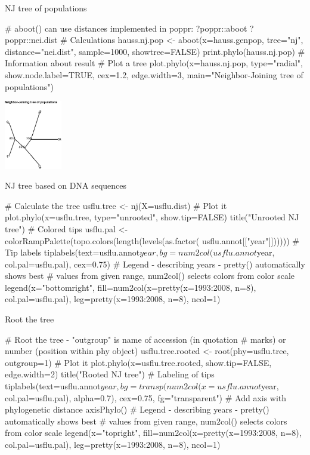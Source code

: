 \documentclass[compress, ucs, xelatex, 11pt, xcolor=svgnames,
	hyperref={
		bookmarks=true,
		unicode=true,
		colorlinks=true,
		pdftitle={Molecular data in R},
		plainpages=false,
		pdfauthor={Vojtech Zeisek},
		pdfsubject={Course about phylogeny and evolution in R},
		pdfcreator={XeLaTeX},
		pdfkeywords={R, evolution, phylogeny, molecular data},
		linkcolor=Tomato,
		anchorcolor=SaddleBrown,
		citecolor=Goldenrod,
		filecolor=DarkMagenta,
		menucolor=Sienna,
		urlcolor=DarkTurquoise,
		pdftex},
	url={hyphens, lowtilde} %
	]{beamer}
\begin{document}
\begin{frame}[fragile]{NJ tree of populations}
	\begin{spluscode}
    # aboot() can use distances implemented in poppr:
    ?poppr::aboot
    ?poppr::nei.dist
    # Calculations
    hauss.nj.pop <- aboot(x=hauss.genpop, tree="nj", distance="nei.dist",
      sample=1000, showtree=FALSE)
    print.phylo(hauss.nj.pop) # Information about result
    # Plot a tree
    plot.phylo(x=hauss.nj.pop, type="radial", show.node.label=TRUE,
      cex=1.2, edge.width=3, main="Neighbor-Joining tree of populations")
	\end{spluscode}
	\begin{center}
		\includegraphics[height=3cm]{nj_pop.png}
	\end{center}
\end{frame}

\begin{frame}[fragile]{NJ tree based on DNA sequences}
	\begin{spluscode}
    # Calculate the tree
    usflu.tree <- nj(X=usflu.dist)
    # Plot it
    plot.phylo(x=usflu.tree, type="unrooted", show.tip=FALSE)
    title("Unrooted NJ tree")
    # Colored tips
    usflu.pal <- colorRampPalette(topo.colors(length(levels(as.factor(
      usflu.annot[["year"]])))))
    # Tip labels
    tiplabels(text=usflu.annot$year, bg=num2col(usflu.annot$year,
      col.pal=usflu.pal), cex=0.75)
    # Legend - describing years - pretty() automatically shows best
    # values from given range, num2col() selects colors from color scale
    legend(x="bottomright", fill=num2col(x=pretty(x=1993:2008, n=8),
      col.pal=usflu.pal), leg=pretty(x=1993:2008, n=8), ncol=1)
	\end{spluscode}
\end{frame}

\begin{frame}[fragile]{Root the tree}
	\begin{spluscode}
    # Root the tree - "outgroup" is name of accession (in quotation
    # marks) or number (position within phy object)
    usflu.tree.rooted <- root(phy=usflu.tree, outgroup=1)
    # Plot it
    plot.phylo(x=usflu.tree.rooted, show.tip=FALSE, edge.width=2)
    title("Rooted NJ tree")
    # Labeling of tips
    tiplabels(text=usflu.annot$year, bg=transp(num2col(x=usflu.annot$year,
      col.pal=usflu.pal), alpha=0.7), cex=0.75, fg="transparent")
    # Add axis with phylogenetic distance
    axisPhylo()
    # Legend - describing years - pretty() automatically shows best
    # values from given range, num2col() selects colors from color scale
    legend(x="topright", fill=num2col(x=pretty(x=1993:2008, n=8),
      col.pal=usflu.pal), leg=pretty(x=1993:2008, n=8), ncol=1)
	\end{spluscode}
\end{frame}
\end{document}

